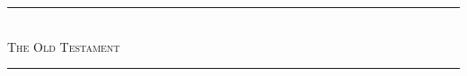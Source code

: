 \onecolumn
\vspace*{50ex}
\begin{center}
	\rule{15em}{.25mm}\\
	\vspace{1.5ex}
	{\Large{\scshape The Old Testament}}
	\par
	\rule{15em}{.25mm}
\end{center}
\vfill
\twocolumn
